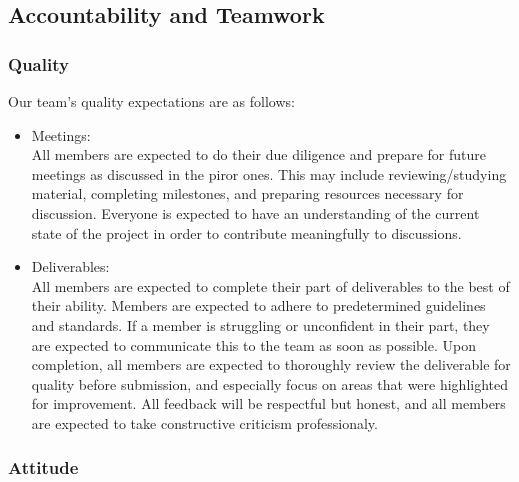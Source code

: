 \documentclass{article}
\begin{document}
\subsection*{Accountability and Teamwork}

\subsubsection*{Quality} 

Our team's quality expectations are as follows:
\begin{itemize}
  \item Meetings: \\All members are expected to do their due diligence and prepare for future meetings as discussed in the piror ones. This may include reviewing/studying material, completing milestones, and preparing resources necessary for discussion. Everyone is expected to have an understanding of the current state of the project in order to contribute meaningfully to discussions.
  \item Deliverables: \\All members are expected to complete their part of deliverables to the best of their ability. Members are expected to adhere to predetermined guidelines and standards. If a member is struggling or unconfident in their part, they are expected to communicate this to the team as soon as possible. Upon completion, all members are expected to thoroughly review the deliverable for quality before submission, and especially focus on areas that were highlighted for improvement. All feedback will be respectful but honest, and all members are expected to take constructive criticism professionaly.
\end{itemize}

\subsubsection*{Attitude}
\end{document}
